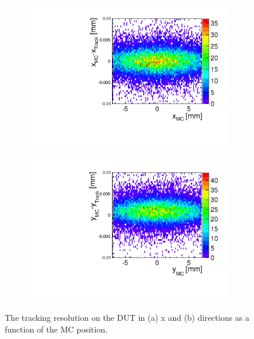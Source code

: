 \begin{figure}[htbp] \centering
  \begin{subfigure}[b]{0.45\textwidth}
    \includegraphics[width=\textwidth]{figures/Telescope/Unbiased_trackRes_DUT_x_2D.pdf}
    \caption{}
  \end{subfigure}\hfill
  \begin{subfigure}[b]{0.45\textwidth}
    \includegraphics[width=\textwidth]{figures/Telescope/Unbiased_trackRes_DUT_y_2D.pdf}
    \caption{}
  \end{subfigure}
  \caption{The tracking resolution on the DUT in (a) x and (b)
    directions as a function of the MC position.}
  \label{fig:DUT_MC_track_2D}
\end{figure}




